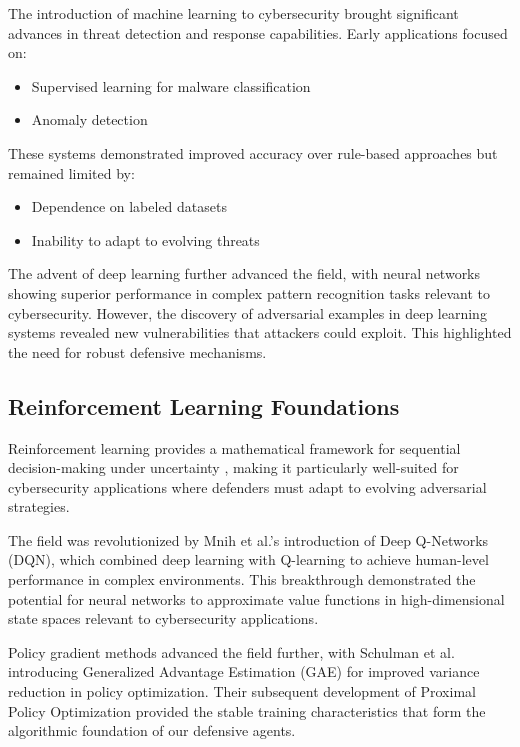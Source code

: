 \documentclass[12pt,oneside]{article}
\begin{document}
The introduction of machine learning to cybersecurity brought significant advances in threat detection and response capabilities. Early applications focused on:
\begin{itemize}
    \item Supervised learning for malware classification
    \item Anomaly detection \citep{sommer2010outside}
\end{itemize}

These systems demonstrated improved accuracy over rule-based approaches but remained limited by:
\begin{itemize}
    \item Dependence on labeled datasets
    \item Inability to adapt to evolving threats
\end{itemize}

The advent of deep learning further advanced the field, with neural networks showing superior performance in complex pattern recognition tasks relevant to cybersecurity. However, the discovery of adversarial examples in deep learning systems \citep{goodfellow2014explaining} revealed new vulnerabilities that attackers could exploit. This highlighted the need for robust defensive mechanisms.

\subsection{Reinforcement Learning Foundations}

Reinforcement learning provides a mathematical framework for sequential decision-making under uncertainty \citep{sutton2018reinforcement}, making it particularly well-suited for cybersecurity applications where defenders must adapt to evolving adversarial strategies.

The field was revolutionized by Mnih et al.'s \cite{mnih2015human} introduction of Deep Q-Networks (DQN), which combined deep learning with Q-learning to achieve human-level performance in complex environments. This breakthrough demonstrated the potential for neural networks to approximate value functions in high-dimensional state spaces relevant to cybersecurity applications.

Policy gradient methods advanced the field further, with Schulman et al. \cite{schulman2015generalized} introducing Generalized Advantage Estimation (GAE) for improved variance reduction in policy optimization. Their subsequent development of Proximal Policy Optimization \cite{schulman2017proximal} provided the stable training characteristics that form the algorithmic foundation of our defensive agents.
\end{document}
